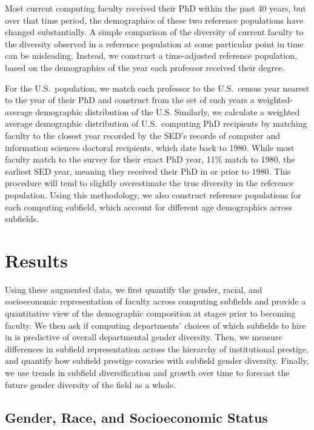 \documentclass[reprint, twocolumn, aps, nofootinbib, superscriptaddress, longbibliography]{revtex4-1}
\begin{document}
Most current computing faculty received their PhD within the past 40 years, but over that time period, the demographics of these two reference populations have changed substantially. A simple comparison of the diversity of current faculty to the diversity observed in a reference population at some particular point in time can be misleading. Instead, we construct a time-adjusted reference population, based on the demographics of the year each professor received their degree. 

For the U.S.~population, we match each professor to the U.S.~census year nearest to the year of their PhD and construct from the set of such years a weighted-average demographic distribution of the U.S. Similarly, we calculate a weighted average demographic distribution of U.S.~computing PhD recipients by matching faculty to the closest year recorded by the SED’s records of computer and information sciences doctoral recipients, which date back to 1980. While most faculty match to the survey for their exact PhD year, 11\% match to 1980, the earliest SED year, meaning they received their PhD in or prior to 1980. This procedure will tend to slightly overestimate the true diversity in the reference population. Using this methodology, we also construct reference populations for each computing subfield, which account for different age demographics across subfields. 

\section{Results} \label{sec:results}


Using these augmented data, we first quantify the gender, racial, and socioeconomic representation of faculty across computing subfields and provide a quantitative view of the demographic composition at stages prior to becoming faculty. We then ask if computing departments' choices of which subfields to hire in is predictive of overall departmental gender diversity. Then, we measure differences in subfield representation across the hierarchy of institutional prestige, and quantify how subfield prestige covaries with subfield gender diversity. Finally, we use trends in subfield diversification and growth over time to forecast the future gender diversity of the field as a whole. 

\subsection{Gender, Race, and Socioeconomic Status} 
\end{document}
